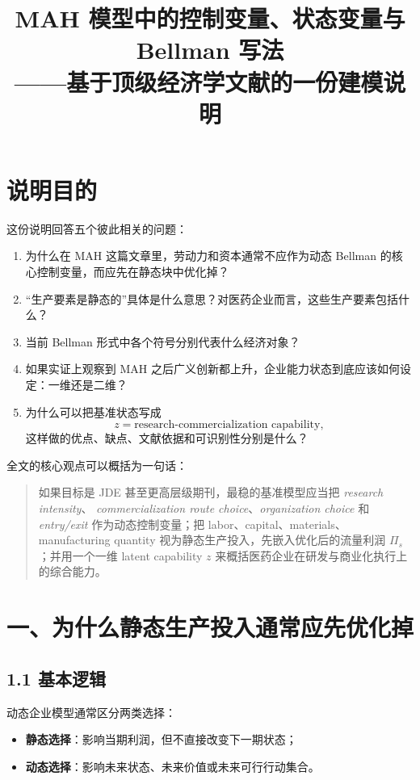 \documentclass[12pt,fontset=none]{ctexart}
\title{MAH 模型中的控制变量、状态变量与 Bellman 写法\\
——基于顶级经济学文献的一份建模说明}
\author{}
\date{}
\begin{document}
\maketitle

\section{说明目的}

这份说明回答五个彼此相关的问题：

\begin{enumerate}[leftmargin=2em]
    \item 为什么在 MAH 这篇文章里，劳动力和资本通常不应作为动态 Bellman 的核心控制变量，而应先在静态块中优化掉？
    \item “生产要素是静态的”具体是什么意思？对医药企业而言，这些生产要素包括什么？
    \item 当前 Bellman 形式中各个符号分别代表什么经济对象？
    \item 如果实证上观察到 MAH 之后广义创新都上升，企业能力状态到底应该如何设定：一维还是二维？
    \item 为什么可以把基准状态写成
    \[
    z=\text{research-commercialization capability},
    \]
    这样做的优点、缺点、文献依据和可识别性分别是什么？
\end{enumerate}

全文的核心观点可以概括为一句话：

\begin{quote}
如果目标是 JDE 甚至更高层级期刊，最稳的基准模型应当把 \emph{research intensity}、
\emph{commercialization route choice}、\emph{organization choice} 和
\emph{entry/exit} 作为动态控制变量；把 labor、capital、materials、
manufacturing quantity 视为静态生产投入，先嵌入优化后的流量利润
\(\Pi_s\)；并用一个一维 latent capability \(z\) 来概括医药企业在研发与商业化执行上的综合能力。
\end{quote}

\section{一、为什么静态生产投入通常应先优化掉}

\subsection{1.1 基本逻辑}

动态企业模型通常区分两类选择：

\begin{itemize}[leftmargin=2em]
    \item \textbf{静态选择}：影响当期利润，但不直接改变下一期状态；
    \item \textbf{动态选择}：影响未来状态、未来价值或未来可行行动集合。
\end{itemize}
\end{document}
